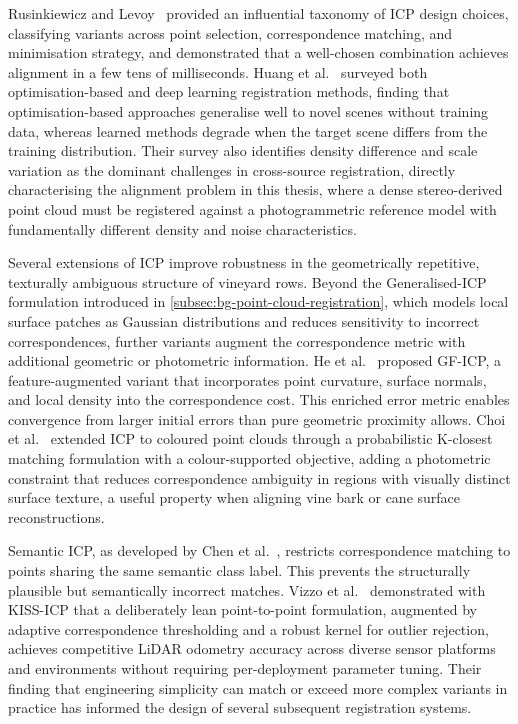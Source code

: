 Rusinkiewicz and Levoy~\cite{rusinkiewiczEfficientVariantsICP2001} provided an influential taxonomy of ICP design choices, classifying variants across point selection, correspondence matching, and minimisation strategy, and demonstrated that a well-chosen combination achieves alignment in a few tens of milliseconds. Huang et al.~\cite{huangComprehensiveSurveyPoint2021} surveyed both optimisation-based and deep learning registration methods, finding that optimisation-based approaches generalise well to novel scenes without training data, whereas learned methods degrade when the target scene differs from the training distribution. Their survey also identifies density difference and scale variation as the dominant challenges in cross-source registration, directly characterising the alignment problem in this thesis, where a dense stereo-derived point cloud must be registered against a photogrammetric reference model with fundamentally different density and noise characteristics.

Several extensions of ICP improve robustness in the geometrically repetitive, texturally ambiguous structure of vineyard rows. Beyond the Generalised-ICP formulation introduced in \cref{subsec:bg-point-cloud-registration}, which models local surface patches as Gaussian distributions and reduces sensitivity to incorrect correspondences, further variants augment the correspondence metric with additional geometric or photometric information. He et al.~\cite{heIterativeClosestPoints2017} proposed GF-ICP, a feature-augmented variant that incorporates point curvature, surface normals, and local density into the correspondence cost. This enriched error metric enables convergence from larger initial errors than pure geometric proximity allows. Choi et al.~\cite{choiIterativeKClosestPoint2020} extended ICP to coloured point clouds through a probabilistic K-closest matching formulation with a colour-supported objective, adding a photometric constraint that reduces correspondence ambiguity in regions with visually distinct surface texture, a useful property when aligning vine bark or cane surface reconstructions.

Semantic ICP, as developed by Chen et al.~\cite{chenSemanticICPIterativeClosest2025}, restricts correspondence matching to points sharing the same semantic class label. This prevents the structurally plausible but semantically incorrect matches. Vizzo et al.~\cite{vizzoKISSICPDefensePointtoPoint2023} demonstrated with KISS-ICP that a deliberately lean point-to-point formulation, augmented by adaptive correspondence thresholding and a robust kernel for outlier rejection, achieves competitive LiDAR odometry accuracy across diverse sensor platforms and environments without requiring per-deployment parameter tuning. Their finding that engineering simplicity can match or exceed more complex variants in practice has informed the design of several subsequent registration systems.

